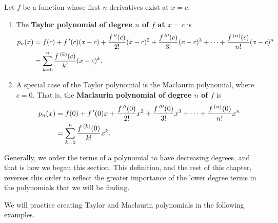 {
\begin{definition}\label{def:taypoly}%
Let $f$ be a function whose first $n$ derivatives exist at $x=c$.
 
\begin{enumerate}
	\item	The \textbf{Taylor polynomial of degree $n$ of $f$ at $x=c$} is 
	\begin{align*}
	p_n(x)
	&= f(c) + f\,'(c)(x-c) + \frac{f\,''(c)}{2!}(x-c)^2+\frac{f\,'''(c)}{3!}(x-c)^3+\dotsb+\frac{f\,^{(n)}(c)}{n!}(x-c)^n \\
	&=\sum_{k=0}^n\frac{f\,^{(k)}(c)}{k!}(x-c)^k.
	\end{align*}
	\item	A special case of the Taylor polynomial is the Maclaurin polynomial, where $c=0$. That is, the \textbf{Maclaurin polynomial of degree $n$ of $f$} is 
	\begin{align*}
	p_n(x)
	&= f(0) + f\,'(0)x + \frac{f\,''(0)}{2!}x^2+\frac{f\,'''(0)}{3!}x^3+\dotsb+\frac{f\,^{(n)}(0)}{n!}x^n \\
	&=\sum_{k=0}^n\frac{f\,^{(k)}(0)}{k!}x^k.
	\end{align*}
\end{enumerate}
\end{definition}
}

Generally, we order the terms of a polynomial to have decreasing degrees, and that is how we began this section.  This definition, and the rest of this chapter, reverses this order to reflect the greater importance of the lower degree terms in the polynomials that we will be finding.


We will practice creating Taylor and Maclaurin polynomials in the following examples.

